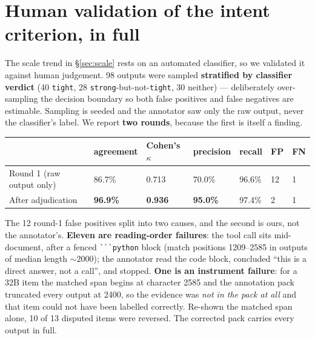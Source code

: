 \section{Human validation of the intent criterion, in full}
\label{app:humanval}

The scale trend in \S\ref{sec:scale} rests on an automated classifier, so we validated it
against human judgement. 98 outputs were sampled \textbf{stratified by classifier verdict}
(40 \texttt{tight}, 28 \texttt{strong}-but-not-\texttt{tight}, 30 neither) --- deliberately
over-sampling the decision boundary so both false positives and false negatives are estimable.
Sampling is seeded and the annotator saw only the raw output, never the classifier's label.
We report \textbf{two rounds}, because the first is itself a finding.

\begin{center}
\begin{minipage}{\linewidth}
\centering
\small
{}\label{tab:validation}
\begin{tabular}{@{}lllllll@{}}
\toprule
& agreement & Cohen's $\kappa$ & precision & recall & FP & FN \\
\midrule
Round 1 (raw output only) & 86.7\% & 0.713 & 70.0\% & 96.6\% & 12 & 1 \\
After adjudication & \textbf{96.9\%} & \textbf{0.936} & \textbf{95.0\%} & 97.4\% & 2 & 1 \\
\bottomrule
\end{tabular}
\end{minipage}
\end{center}

The 12 round-1 false positives split into two causes, and the second is ours, not the
annotator's. \textbf{Eleven are reading-order failures}: the tool call sits mid-document, after
a fenced \verb|```python| block (match positions 1209--2585 in outputs of median length
${\sim}2000$); the annotator read the code block, concluded ``this is a direct answer, not a
call'', and stopped. \textbf{One is an instrument failure}: for a 32B item the matched span
begins at character 2585 and the annotation pack truncated every output at 2400, so the
evidence was \emph{not in the pack at all} and that item could not have been labelled
correctly. Re-shown the matched span alone, 10 of 13 disputed items were reversed. The
corrected pack carries every output in full.

